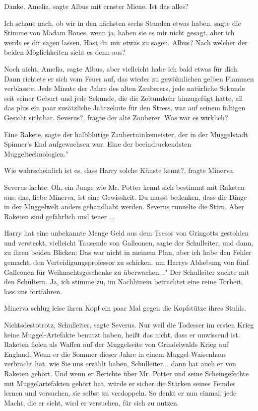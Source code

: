 \glqq Danke, Amelia\grqq{}, sagte Albus mit ernster Miene. \glqq Ist das
alles?\grqq{}

\glqq Ich schaue nach, ob wir in den nächsten sechs Stunden etwas haben\grqq{},
sagte die Stimme von Madam Bones, \glqq wenn ja, haben sie es mir nicht gesagt,
aber ich werde es dir sagen lassen. Hast du mir etwas zu sagen, Albus? Nach
welcher der beiden Möglichkeiten sieht es denn aus?\grqq{}

\glqq Noch nicht, Amelia\grqq{}, sagte Albus, \glqq aber vielleicht habe ich
bald etwas für dich.\grqq{} Dann richtete er sich vom Feuer auf, das wieder zu
gewöhnlichen gelben Flammen verblasste. Jede Minute der Jahre des alten
Zauberers, jede natürliche Sekunde seit seiner Geburt und jede Sekunde, die die
Zeitumkehr hinzugefügt hatte, all das plus ein paar zusätzliche Jahrzehnte für
den Stress, war auf seinem faltigen Gesicht sichtbar. \glqq Severus?\grqq{},
fragte der alte Zauberer. \glqq Was war es wirklich?\grqq{}

\glqq Eine Rakete\grqq{}, sagte der halbblütige Zaubertränkemeister, der in der
Muggelstadt Spinner's End aufgewachsen war. \glqq Eine der beeindruckendsten
Muggeltechnologien."

\glqq Wie wahrscheinlich ist es, dass Harry solche Künste kennt?\grqq{}, fragte
Minerva.

Severus lachte: \glqq Oh, ein Junge wie Mr. Potter kennt sich bestimmt mit
Raketen aus; das, liebe Minerva, ist eine Gewissheit. Du musst bedenken, dass
die Dinge in der Muggelwelt anders gehandhabt werden.\grqq{} Severus runzelte
die Stirn. \glqq Aber Raketen sind gefährlich und teuer ...\grqq{}

\glqq Harry hat eine unbekannte Menge Geld aus dem Tresor von Gringotts
gestohlen und versteckt, vielleicht Tausende von Galleonen\grqq{}, sagte der
Schulleiter, und dann, zu ihren beiden Blicken: \glqq Das war nicht in meinem
Plan, aber ich habe den Fehler gemacht, den Verteidigungsprofessor zu schicken,
um Harrys Abhebung von fünf Galleonen für Weihnachtsgeschenke zu überwachen..."
Der Schulleiter zuckte mit den Schultern. \glqq Ja, ich stimme zu, im Nachhinein
betrachtet eine reine Torheit, lass uns fortfahren.\grqq{}

Minerva schlug leise ihren Kopf ein paar Mal gegen die Kopfstütze ihres Stuhls.

\glqq Nichtsdestotrotz, Schulleiter\grqq{}, sagte Severus. \glqq Nur weil die
Todesser im ersten Krieg keine Muggel-Artefakte benutzt haben, heißt das nicht,
dass er unwissend ist. Raketen fielen als Waffen auf der Muggelseite von
Grindelwalds Krieg auf England. Wenn er die Sommer dieser Jahre in einem
Muggel-Waisenhaus verbracht hat, wie Sie uns erzählt haben, Schulleiter... dann
hat auch er von Raketen gehört. Und wenn er Berichte über Mr. Potter und seine
Scheingefechte mit Muggelartefakten gehört hat, würde er sicher die Stärken
seines Feindes lernen und versuchen, sie selbst zu verdoppeln. So denkt er nun
einmal; jede Macht, die er sieht, wird er versuchen, für sich zu nutzen.\grqq{}

